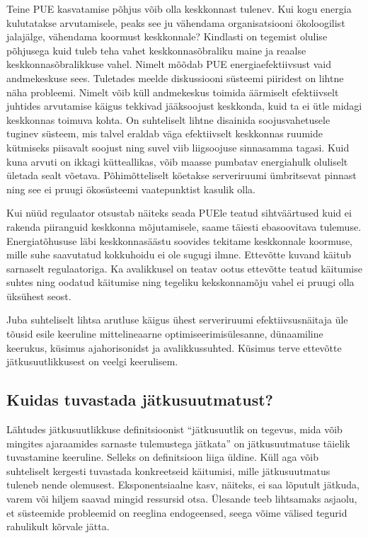 Teine PUE kasvatamise põhjus võib olla keskkonnast tulenev. Kui kogu energia kulutatakse arvutamisele, peaks see ju vähendama organisatsiooni ökoloogilist jalajälge, vähendama koormust keskkonnale? Kindlasti on tegemist olulise põhjusega kuid tuleb teha vahet keskkonnasõbraliku maine ja reaalse keskkonnasõbralikkuse vahel. Nimelt mõõdab PUE energiaefektiivsust vaid andmekeskuse sees. Tuletades meelde diskussiooni süsteemi piiridest on lihtne näha probleemi. Nimelt võib küll andmekeskus toimida äärmiselt efektiivselt juhtides arvutamise käigus tekkivad jääksoojust keskkonda, kuid ta ei ütle midagi keskkonnas toimuva kohta. On suhteliselt lihtne disainida soojusvahetusele tuginev süsteem, mis talvel eraldab väga efektiivselt keskkonnas ruumide kütmiseks piisavalt soojust ning suvel viib liigsoojuse sinnasamma tagasi. Kuid kuna arvuti on ikkagi kütteallikas, võib maasse pumbatav energiahulk oluliselt ületada sealt võetava. Põhimõtteliselt köetakse serveriruumi ümbritsevat pinnast ning see ei pruugi ökosüsteemi vaatepunktist kasulik olla. 

Kui nüüd regulaator otsustab näiteks seada PUEle teatud sihtväärtused kuid ei rakenda piiranguid keskkonna mõjutamisele, saame täiesti ebasoovitava tulemuse. Energiatõhususe läbi keskkonnasäästu soovides tekitame keskkonnale koormuse, mille suhe saavutatud kokkuhoidu ei ole sugugi ilmne. Ettevõtte kuvand käitub sarnaselt regulaatoriga. Ka avalikkusel on teatav ootus ettevõtte teatud käitumise suhtes ning oodatud käitumise ning tegeliku kekskonnamõju vahel ei pruugi olla üksühest seost.

Juba suhteliselt lihtsa arutluse käigus ühest serveriruumi efektiivsusnäitaja üle tõusid esile keeruline mittelineaarne optimiseerimisülesanne, dünaamiline keerukus, küsimus ajahorisonidst ja avalikkussuhted. Küsimus terve ettevõtte jätkusuutlikkusest on veelgi keerulisem. 


\subsection{Kuidas tuvastada jätkusuutmatust?}
Lähtudes jätkusuutlikkuse definitsioonist \enquote{jätkusuutlik on tegevus, mida võib mingites ajaraamides sarnaste tulemustega jätkata} on jätkusuutmatuse täielik tuvastamine keeruline. Selleks on definitsioon liiga üldine. Küll aga võib suhteliselt kergesti tuvastada konkreetseid käitumisi, mille jätkusuutmatus tuleneb nende olemusest. Eksponentsiaalne kasv, näiteks, ei saa lõputult jätkuda, varem või hiljem saavad mingid ressursid otsa. Ülesande teeb lihtsamaks asjaolu, et süsteemide probleemid on reeglina endogeensed, seega võime välised tegurid rahulikult kõrvale jätta.


